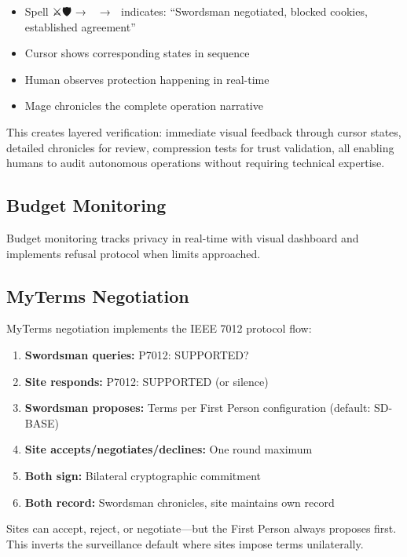 \documentclass[
  11pt,
]{article}
\providecommand{\tightlist}{%
  \setlength{\itemsep}{0pt}\setlength{\parskip}{0pt}}
\begin{document}
\begin{itemize}
\item
  Spell ⚔️🛡️ → 🚫🍪 → 🤝 indicates: ``Swordsman negotiated, blocked
  cookies, established agreement''
\item
  Cursor shows corresponding states in sequence
\item
  Human observes protection happening in real-time
\item
  Mage chronicles the complete operation narrative
\end{itemize}

This creates layered verification: immediate visual feedback through
cursor states, detailed chronicles for review, compression tests for
trust validation, all enabling humans to audit autonomous operations
without requiring technical expertise.

\subsection{Budget Monitoring}\label{budget-monitoring}

Budget monitoring tracks privacy in real-time with visual dashboard and
implements refusal protocol when limits approached.

\subsection{MyTerms Negotiation}\label{myterms-negotiation}

MyTerms negotiation implements the IEEE 7012 protocol flow:

\begin{enumerate}
\def\labelenumi{\arabic{enumi}.}
\tightlist
\item
  \textbf{Swordsman queries:} P7012: SUPPORTED?
\item
  \textbf{Site responds:} P7012: SUPPORTED (or silence)
\item
  \textbf{Swordsman proposes:} Terms per First Person configuration
  (default: SD-BASE)
\item
  \textbf{Site accepts/negotiates/declines:} One round maximum
\item
  \textbf{Both sign:} Bilateral cryptographic commitment
\item
  \textbf{Both record:} Swordsman chronicles, site maintains own record
\end{enumerate}

Sites can accept, reject, or negotiate---but the First Person always
proposes first. This inverts the surveillance default where sites impose
terms unilaterally.
\end{document}
